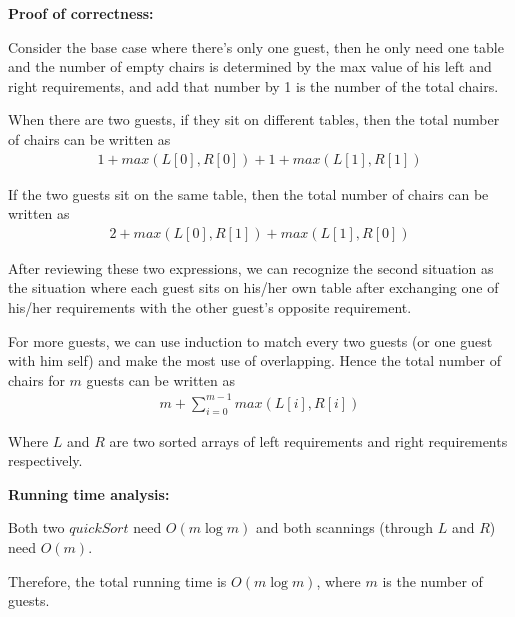 \documentclass{article}
\begin{document}
{\par\textbf{Proof of correctness: }
\par Consider the base case where there's only one guest, then he only need one table and the number of empty chairs is determined by the max value of his left and right requirements, and add that number by 1 is the number of the total chairs.
\par When there are two guests, if they sit on different tables, then the total number of chairs can be written as
\begin{align*}
	1 + max(L[0], R[0])	+ 1 + max(L[1], R[1])
\end{align*}
\par If the two guests sit on the same table, then the total number of chairs can be written as
\begin{align*}
	2 + max(L[0], R[1]) + max(L[1], R[0])
\end{align*}
\par After reviewing these two expressions, we can recognize the second situation as the situation where each guest sits on his/her own table after exchanging one of his/her requirements with the other guest's opposite requirement.
\par For more guests, we can use induction to match every two guests (or one guest with him self) and make the most use of overlapping. Hence the total number of chairs for $m$ guests can be written as
\begin{align*}
	m + \sum_{i=0}^{m-1}{max(L[i], R[i])}
\end{align*}
\par Where $L$ and $R$ are two sorted arrays of left requirements and right requirements respectively.\\

\par\textbf{Running time analysis: }
\par Both two $quickSort$ need $O(m\log m)$ and both scannings (through $L$ and $R$) need $O(m)$.
\par Therefore, the total running time is $O(m\log m)$, where $m$ is the number of guests.
}
\end{document}
